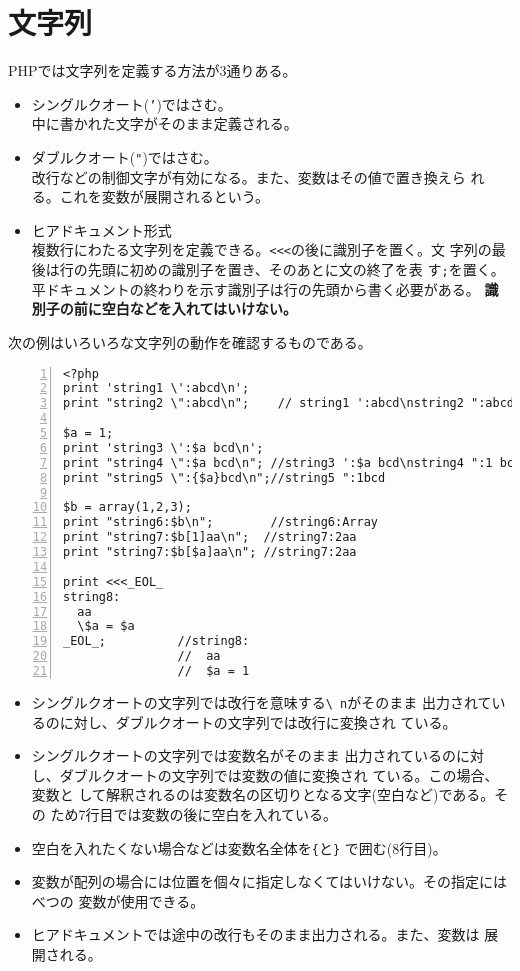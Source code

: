 \section{文字列}PHPでは文字列を定義する方法が3通りある。
\begin{itemize}
 \item シングルクオート(\texttt{'})ではさむ。\\
   中に書かれた文字がそのまま定義される。
 \item ダブルクオート(\Verb+"+)ではさむ。%
       \\改行などの制御文字が有効になる。また、変数はその値で置き換えら
       れる。これを変数が展開されるという。
 \item ヒアドキュメント形式\\
   複数行にわたる文字列を定義できる。\texttt{<<<}の後に識別子を置く。文
       字列の最後は行の先頭に初めの識別子を置き、そのあとに文の終了を表
       す\texttt{;}を置く。平ドキュメントの終わりを示す識別子は行の先頭から書く必要がある。
       {\bfseries 識別子の前に空白などを入れてはいけない。}
\end{itemize}
\begin{Exec}\upshape
次の例はいろいろな文字列の動作を確認するものである。
\begin{Verbatim}[numbers=left]
<?php
print 'string1 \':abcd\n';
print "string2 \":abcd\n";    // string1 ':abcd\nstring2 ":abcd

$a = 1;
print 'string3 \':$a bcd\n';
print "string4 \":$a bcd\n"; //string3 ':$a bcd\nstring4 ":1 bcd
print "string5 \":{$a}bcd\n";//string5 ":1bcd

$b = array(1,2,3);
print "string6:$b\n";        //string6:Array
print "string7:$b[1]aa\n";  //string7:2aa
print "string7:$b[$a]aa\n"; //string7:2aa

print <<<_EOL_
string8:
  aa
  \$a = $a
_EOL_;          //string8:
                //  aa
                //  $a = 1
\end{Verbatim}
\begin{itemize}
 \item シングルクオートの文字列では改行を意味する\texttt{\textbackslash
       n}がそのまま
       出力されているのに対し、ダブルクオートの文字列では改行に変換され
       ている。
 \item シングルクオートの文字列では変数名がそのまま
       出力されているのに対し、ダブルクオートの文字列では変数の値に変換され
       ている。この場合、変数と
       して解釈されるのは変数名の区切りとなる文字(空白など)である。その
       ため7行目では変数の後に空白を入れている。
 \item 空白を入れたくない場合などは変数名全体を\texttt{\{}と\texttt{\}}
       で囲む(8行目)。
 \item 変数が配列の場合には位置を個々に指定しなくてはいけない。その指定にはべつの
       変数が使用できる。
 \item ヒアドキュメントでは途中の改行もそのまま出力される。また、変数は
       展開される。
\end{itemize}
\end{Exec}
